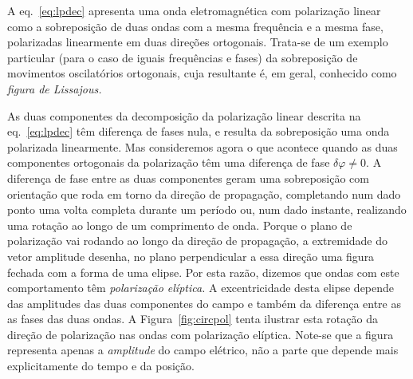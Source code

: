 A eq.~\eqref{eq:lpdec} apresenta uma onda eletromagnética com polarização linear
como a sobreposição de duas ondas com a mesma frequência e a mesma fase,
polarizadas linearmente em duas direções ortogonais. Trata-se de um exemplo
particular (para o caso de iguais frequências e fases) da sobreposição de
movimentos oscilatórios ortogonais, cuja resultante é, em geral, conhecido como
\emph{figura de Lissajous.}

As duas componentes da decomposição da polarização linear descrita na
eq.~\eqref{eq:lpdec} têm diferença de fases nula, e resulta da sobreposição uma
onda polarizada linearmente. Mas consideremos agora o que acontece quando as
duas componentes ortogonais da polarização têm uma diferença de fase
$\delta\varphi\neq0$. A diferença de fase entre as duas componentes geram uma
sobreposição com orientação que roda em torno da direção de propagação,
completando num dado ponto uma volta completa durante um período ou, num dado
instante, realizando uma rotação ao longo de um comprimento de onda. Porque o
plano de polarização vai rodando ao longo da direção de propagação, a
extremidade do vetor amplitude desenha, no plano perpendicular a essa direção
uma figura fechada com a forma de uma elipse. Por esta razão, dizemos que ondas
com este comportamento têm \emph{polarização elíptica.} A excentricidade desta
elipse depende das amplitudes das duas componentes do campo e também da
diferença entre as as fases das duas ondas. A Figura~\ref{fig:circpol} tenta
ilustrar esta rotação da direção de polarização nas ondas com polarização
elíptica. Note-se que a figura representa apenas a \emph{amplitude} do campo
elétrico, não a parte que depende mais explicitamente do tempo e da posição. 
